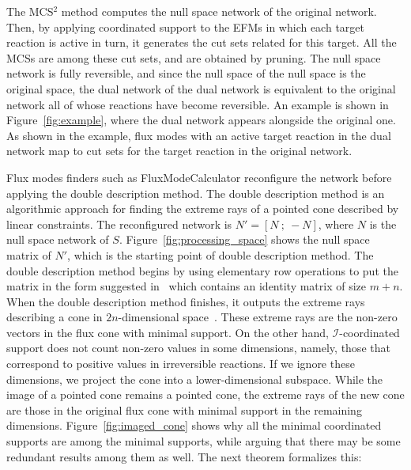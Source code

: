 \documentclass{bioinfo}
\theoremstyle{plain}
\theoremstyle{definition}
\begin{document}
The MCS$^2$ method computes the null space network of the original network. Then, by applying coordinated support to the EFMs in which each target reaction is active in turn, it generates the cut sets related for this target. All the MCSs are among these cut sets, and are obtained by pruning. The null space network is fully reversible, and since the null space of the null space is the original space, the dual network of the dual network is equivalent to the original network all of whose reactions have become reversible. An example is shown in Figure~\ref{fig:example}, where the dual network appears alongside the original one. As shown in the example, flux modes with an active target reaction in the dual network map to cut sets for the target reaction in the original network.

Flux modes finders such as FluxModeCalculator \cite{Fluxcalculator} reconfigure the network before applying the double description method. The double description method is an algorithmic approach for finding the extreme rays of a pointed cone described by linear constraints. The reconfigured network is $N' = [N~;~-N]$, where $N$ is the null space network of $S$. Figure~\ref{fig:processing_space} shows the null space matrix of $N'$, which is the starting point of double description method. The double description method begins by using elementary row operations to put the matrix in the form suggested in~\cite{initial_null} which contains an identity matrix of size $m+n$. When the double description method finishes, it outputs the extreme rays describing a cone in $2n$-dimensional space~\cite{bitpattern}. These extreme rays are the non-zero vectors in the flux cone with minimal support. On the other hand, $\mathcal{I}$-coordinated support does not count non-zero values in some dimensions, namely, those that correspond to positive values in irreversible reactions. If we ignore these dimensions, we project the cone into a lower-dimensional subspace. While the image of a pointed cone remains a pointed cone, the extreme rays of the new cone are those in the original flux cone with minimal support in the remaining dimensions. Figure~\ref{fig:imaged_cone} shows why all the minimal coordinated supports are among the minimal supports, while arguing that there may be some redundant results among them as well. The next theorem formalizes this:
\end{document}
